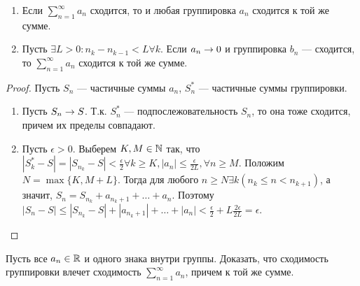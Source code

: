 \begin{lemma}
    \begin{enumerate}
        \item Если \(\sum_{n = 1}^\infty a_n\) сходится, то и любая группировка \(a_n\) сходится к той же сумме.
        \item Пусть \(\exists L > 0: n_{k} - n_{k - 1} < L \forall k\). Если \(a_n \rightarrow 0\) и группировка \(b_n\) --- сходится, то \(\sum_{n = 1}^\infty a_n\) сходится к той же сумме.
    \end{enumerate}
\end{lemma}
\begin{proof}
    Пусть \(S_n\) --- частичные суммы \(a_n\), \(S^*_n\) --- частичные суммы группировки.
    \begin{enumerate}
        \item Пусть \(S_n \rightarrow S\). Т.к. \(S_n^*\) --- подпослежовательность \(S_n\), то она тоже сходится, причем их пределы совпадают.
        \item Пусть \(\epsilon > 0\). Выберем \(K, M \in \mathbb{N}\) так, что \(|S_k^* - S| = |S_{n_k} - S| < \frac{\epsilon}{2} \forall k \ge K, |a_n| \le \frac{\epsilon}{2L}, \forall n \ge M\). Положим \(N = \max\{K, M + L\}\). Тогда для любого \(n \ge N \exists k (n_k \le n < n_{k + 1})\), а значит, \(S_n = S_{n_k} + a_{n_k + 1} + \dots + a_n\). Поэтому \(|S_n - S| \le |S_{n_k} - S| + |a_{n_k + 1}| + \dots + |a_{n}| < \frac{\epsilon}{2} + L\frac{2\epsilon}{2L} = \epsilon\).
    \end{enumerate} 
\end{proof}

\begin{problem}
    Пусть все \(a_n \in \mathbb{R}\) и одного знака внутри группы. Доказать, что сходимость группировки влечет сходимость \(\sum_{n = 1}^\infty a_n\), причем к той же сумме.
\end{problem}